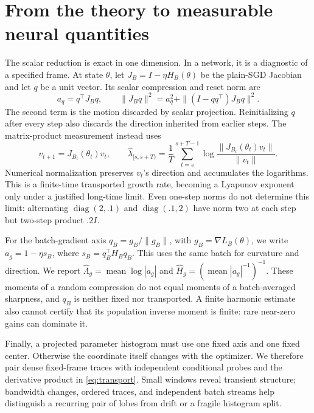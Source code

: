 \section{From the theory to measurable neural quantities}
\label{sec:diagnostics}
The scalar reduction is exact in one dimension. In a network, it is a diagnostic of a specified frame. At state $\theta$, let $J_B=I-\eta H_B(\theta)$ be the plain-SGD Jacobian and let $q$ be a unit vector. Its scalar compression and reset norm are
\begin{equation}
 a_q=q^\top J_Bq,\qquad
 \|J_Bq\|^2=a_q^2+\|(I-qq^\top)J_Bq\|^2.
 \label{eq:compression-identity}
\end{equation}
The second term is the motion discarded by scalar projection. Reinitializing $q$ after every step also discards the direction inherited from earlier steps. The matrix-product measurement instead uses
\begin{equation}
 v_{t+1}=J_{B_t}(\theta_t)v_t,\qquad
 \widehat\lambda_{[s,s+T)}=\frac1T
 \sum_{t=s}^{s+T-1}\log\frac{\|J_{B_t}(\theta_t)v_t\|}{\|v_t\|}.
 \label{eq:transport}
\end{equation}
Numerical normalization preserves $v_t$'s direction and accumulates the logarithms. This is a finite-time transported growth rate, becoming a Lyapunov exponent only under a justified long-time limit. Even one-step norms do not determine this limit: alternating $\operatorname{diag}(2,.1)$ and $\operatorname{diag}(.1,2)$ have norm two at each step but two-step product $.2I$.

For the batch-gradient axis $q_B=g_B/\|g_B\|$, with $g_B=\nabla L_B(\theta)$, we write $a_g=1-\eta s_B$, where $s_B=q_B^\top H_Bq_B$. This uses the same batch for curvature and direction. We report $\widehat\Lambda_g=\operatorname{mean}\log|a_g|$ and $\widehat H_g=(\operatorname{mean}|a_g|^{-1})^{-1}$. These moments of a random compression do not equal moments of a batch-averaged sharpness, and $q_B$ is neither fixed nor transported. A finite harmonic estimate also cannot certify that its population inverse moment is finite: rare near-zero gains can dominate it.

Finally, a projected parameter histogram must use one fixed axis and one fixed center. Otherwise the coordinate itself changes with the optimizer. We therefore pair dense fixed-frame traces with independent conditional probes and the derivative product in \eqref{eq:transport}. Small windows reveal transient structure; bandwidth changes, ordered traces, and independent batch streams help distinguish a recurring pair of lobes from drift or a fragile histogram split.
